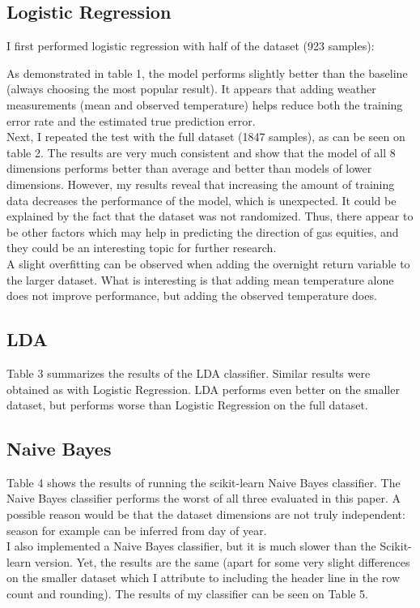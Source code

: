 \documentclass[conference,letterpaper]{IEEEtran}
\begin{document}

\subsection{Logistic Regression}
I first performed logistic regression with half of the dataset (923 samples):



As demonstrated in table 1, the model performs slightly better than the baseline (always choosing the most popular result). It appears that adding weather measurements (mean and
observed temperature) helps reduce both the training error rate and the estimated true prediction error.\\
\indent Next, I repeated the test with the full dataset (1847 samples), as can be seen on table 2. The results are very much consistent and show that the model of all 8
dimensions performs better than average and better than models of lower dimensions. However, my results reveal that increasing the amount of training data decreases the
performance of the model, which is unexpected. It could be explained by the fact that the dataset was not randomized. Thus, there appear to be other factors which may
help in predicting the direction of gas equities, and they could be an interesting topic for further research. \\
\indent A slight overfitting can be observed when adding the overnight return variable to the larger dataset. What is interesting
is that adding mean temperature alone does not improve performance, but adding the observed temperature does. \\

\subsection{LDA}

Table 3 summarizes the results of the LDA classifier. Similar results were obtained as with Logistic Regression. LDA performs even better on the smaller dataset,
but performs worse than Logistic Regression on the full dataset. \\


\subsection{Naive Bayes}
Table 4 shows the results of running the scikit-learn Naive Bayes classifier. The Naive Bayes classifier performs the worst of all three evaluated in this paper. A possible reason
would be that the dataset dimensions are not truly independent: season for example can be inferred from day of year. \\
I also implemented a Naive Bayes classifier, but it is much slower than the Scikit-learn version. Yet, the results are the same
(apart for some very slight differences on the smaller dataset which I attribute to including the header line in the row count and rounding). The results of my classifier
can be seen on Table 5.
\end{document}
